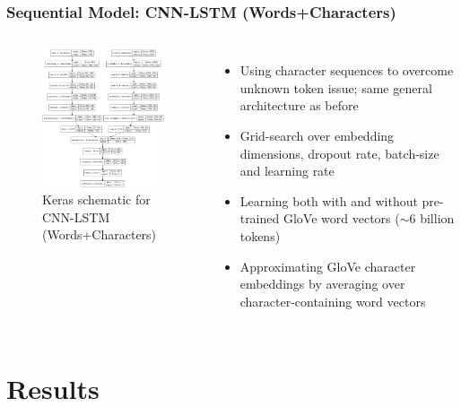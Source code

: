 \documentclass{beamer}
\begin{document}
\begin{framefont}{\footnotesize}
	\begin{frame}
		\frametitle{Sequential Model: CNN-LSTM (Words+Characters)}
		\vspace{-10pt}
		\begin{columns}
			\centering
			\begin{figure}
				\captionsetup{justification=centering}
				\includegraphics[width=4.6cm]{model_combined.png}
				\caption{Keras schematic for CNN-LSTM (Words+Characters)}
			\end{figure}
			\begin{itemize}
				\setlength\itemsep{1.5em}
				\item Using character sequences to overcome unknown token issue; same general architecture as before
				\item Grid-search over embedding dimensions, dropout rate, batch-size and learning rate
				\item Learning both with and without pre-trained GloVe word vectors ($\sim$6 billion tokens)
				\item Approximating GloVe character embeddings by averaging over character-containing word vectors \parencite{charEmbed}
			\end{itemize}
		\end{columns}
	\end{frame}
\end{framefont}

\section{Results}
\end{document}
